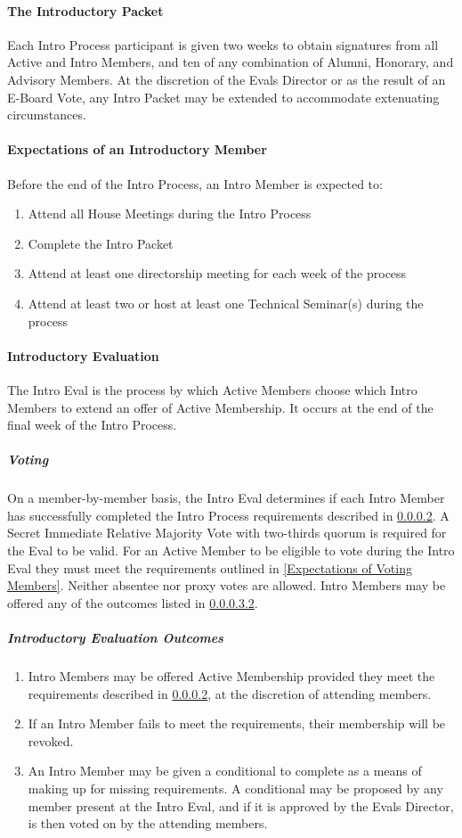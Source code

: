\documentclass{article}
\newcommand{\asubsubsection}[1]{\paragraph{#1} \label{#1}}
\newcommand{\asubsubsubsection}[1]{\subparagraph{#1} \label{#1}}
\begin{document}
\asubsubsection{The Introductory Packet}
Each Intro Process participant is given two weeks to obtain signatures from all Active and Intro Members, and ten of any combination of Alumni, Honorary, and Advisory Members.
At the discretion of the Evals Director or as the result of an E-Board Vote, any Intro Packet may be extended to accommodate extenuating circumstances.

\asubsubsection{Expectations of an Introductory Member}
\renewcommand{\theenumi}{\arabic{enumi}} %
Before the end of the Intro Process, an Intro Member is expected to:
\begin{enumerate}
	\item Attend all House Meetings during the Intro Process
	\item Complete the Intro Packet
	\item Attend at least one directorship meeting for each week of the process
	\item Attend at least two or host at least one Technical Seminar(s) during the process
\end{enumerate}

\asubsubsection{Introductory Evaluation}
The Intro Eval is the process by which Active Members choose which Intro Members to extend an offer of Active Membership.
It occurs at the end of the final week of the Intro Process.

\asubsubsubsection{Voting}
On a member-by-member basis, the Intro Eval determines if each Intro Member has successfully completed the Intro Process requirements described in \ref{Expectations of an Introductory Member}.
A Secret Immediate Relative Majority Vote with two-thirds quorum is required for the Eval to be valid.
For an Active Member to be eligible to vote during the Intro Eval they must meet the requirements outlined in \ref{Expectations of Voting Members}.
Neither absentee nor proxy votes are allowed.
Intro Members may be offered any of the outcomes listed in \ref{Introductory Evaluation Outcomes}.

\asubsubsubsection{Introductory Evaluation Outcomes}
\renewcommand{\theenumi}{\alph{enumi}} %
\begin{enumerate}
	\item Intro Members may be offered Active Membership provided they meet the requirements described in \ref{Expectations of an Introductory Member}, at the discretion of attending members.
	\item If an Intro Member fails to meet the requirements, their membership will be revoked.
	\item An Intro Member may be given a conditional to complete as a means of making up for missing requirements.
	      A conditional may be proposed by any member present at the Intro Eval, and if it is approved by the Evals Director, is then voted on by the attending members.
\end{enumerate}
\end{document}
